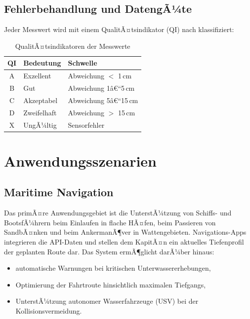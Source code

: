 ﻿\documentclass[a4paper,12pt]{article}
\theoremstyle{definition}
\begin{document}
\subsection{Fehlerbehandlung und DatengÃ¼te}

Jeder Messwert wird mit einem QualitÃ¤tsindikator (QI) nach \cite{iho2020} klassifiziert:

\begin{table}[H]
\centering
\caption{QualitÃ¤tsindikatoren der Messwerte}
\label{tab:qualitaet}
\renewcommand{\arraystretch}{1.3}
\begin{tabular}{@{}cll@{}}
\toprule
\textbf{QI} & \textbf{Bedeutung} & \textbf{Schwelle} \\
\midrule
A & Exzellent & Abweichung $<$ 1\,cm \\
B & Gut & Abweichung 1â€“5\,cm \\
C & Akzeptabel & Abweichung 5â€“15\,cm \\
D & Zweifelhaft & Abweichung $>$ 15\,cm \\
X & UngÃ¼ltig & Sensorfehler \\
\bottomrule
\end{tabular}
\end{table}

\section{Anwendungsszenarien}

\subsection{Maritime Navigation}

Das primÃ¤re Anwendungsgebiet ist die UnterstÃ¼tzung von Schiffs- und BootsfÃ¼hrern beim
Einlaufen in flache HÃ¤fen, beim Passieren von SandbÃ¤nken und beim AnkermanÃ¶ver in
Wattengebieten. Navigations-Apps integrieren die API-Daten und stellen dem KapitÃ¤n
ein aktuelles Tiefenprofil der geplanten Route dar. Das System ermÃ¶glicht darÃ¼ber hinaus:

\begin{itemize}
  \item automatische Warnungen bei kritischen Unterwassererhebungen,
  \item Optimierung der Fahrtroute hinsichtlich maximalen Tiefgangs,
  \item UnterstÃ¼tzung autonomer Wasserfahrzeuge (USV) bei der Kollisionsvermeidung.
\end{itemize}
\end{document}
